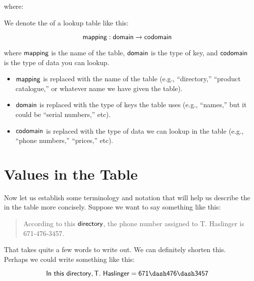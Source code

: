 \documentclass[../../../main.tex]{subfiles}
\begin{document}
\noindent
where:

\begin{terminology}
  We denote the  of a lookup table like this:

  \begin{equation*}
    \mathsf{mapping} : \mathsf{domain} \rightarrow \mathsf{codomain}
  \end{equation*}

  where $\mathsf{mapping}$ is the name of the table, $\mathsf{domain}$ is the type of key, and $\mathsf{codomain}$ is the type of data you can lookup.
\end{terminology}

\begin{itemize}

  \item $\mathsf{mapping}$ is replaced with the name of the table (e.g., ``directory,'' ``product catalogue,'' or whatever name we have given the table).
  
  \item $\mathsf{domain}$ is replaced with the type of keys the table uses (e.g., ``names,'' but it could be ``serial numbers,'' etc). 
  
  \item $\mathsf{codomain}$ is replaced with the type of data we can lookup in the table (e.g., ``phone numbers,'' ``prices,'' etc).
  
\end{itemize}


\section{Values in the Table}

Now let us establish some terminology and notation that will help us describe the  in the table more concisely. Suppose we want to say something like this:

\begin{quote}
  According to this $\mathsf{directory}$, the phone number assigned to T. Haslinger is 671-476-3457.
\end{quote}

\noindent
That takes quite a few words to write out. We can definitely shorten this. Perhaps we could write something like this:

\begin{equation*}
  \e{In~this~directory, T.~Haslinger = 671\dash476\dash3457}
\end{equation*}
\end{document}
